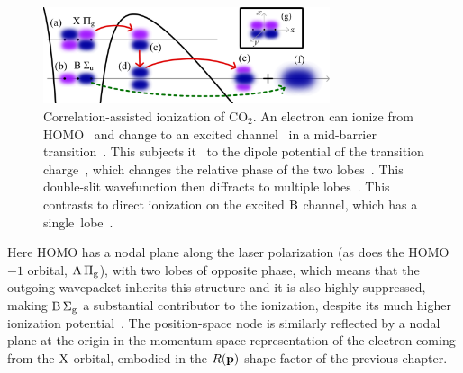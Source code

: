 \begin{figure}[htbp]
  \centering
  \subfloat{\label{f3-CO2-X-to-B-coupling-a}}
  \subfloat{\label{f3-CO2-X-to-B-coupling-b}}
  \subfloat{\label{f3-CO2-X-to-B-coupling-c}}
  \subfloat{\label{f3-CO2-X-to-B-coupling-d}}
  \subfloat{\label{f3-CO2-X-to-B-coupling-e}}
  \subfloat{\label{f3-CO2-X-to-B-coupling-f}}
  \subfloat{\label{f3-CO2-X-to-B-coupling-g}}
  \includegraphics[width=0.75\textwidth]{3-Multi-channel/Figures/figure3C.png}
  \caption[Scheme for the correlation-assisted tunnelling of aligned CO$_2$, with the direct $\B$ channel competing with cross-channel contributions that start in the $\X$ channel.]{
  Correlation-assisted ionization of CO$_2$. An electron can ionize from HOMO~\protect{} and change to an excited channel~\protect{} in a mid-barrier transition~\protect{}. This subjects it~\protect{} to the dipole potential of the transition charge~\protect{}, which changes the relative phase of the two lobes~\protect{}. This double-slit wavefunction then diffracts to multiple lobes~\protect{}. This contrasts to direct ionization on the excited $\B$ channel, which has a single~lobe~\protect{}.
  }
\label{f3-CO2-X-to-B-coupling}
\end{figure}

Here HOMO has a nodal plane along the laser polarization (as does the HOMO$-1$ \mbox{orbital}, $\mathrm{A}\,\Pi_\mathrm{g}$), with two lobes of opposite phase, which means that the outgoing wavepacket inherits this structure and it is also highly suppressed, making $\mathrm{B}\,\Sigma_\mathrm{g}$ a substantial contributor to the ionization, despite its much higher ionization potential~\cite{meckel_LIED_2008, smirnova_multielectron-hhg_2009, mairesse_high-harmonic-spectroscopy_2010}. The position-space node is similarly reflected by a nodal plane at the origin in the momentum-space representation of the electron coming from the $\X$ orbital, embodied in the $R(\vb{p})$ shape factor of the previous chapter.

